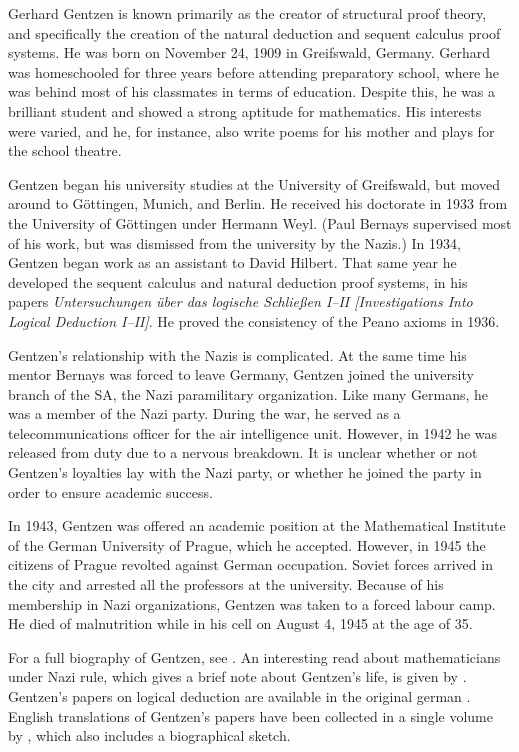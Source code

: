 \documentclass[../../../include/open-logic-section]{subfiles}
\begin{document}



Gerhard Gentzen is known primarily as the creator of structural proof
theory, and specifically the creation of the natural deduction and
sequent calculus proof systems. He was born on November 24, 1909 in
Greifswald, Germany. Gerhard was homeschooled for three years before
attending preparatory school, where he was behind most of his
classmates in terms of education. Despite this, he was a brilliant
student and showed a strong aptitude for mathematics. His interests
were varied, and he, for instance, also write poems for his mother and plays
for the school theatre.

Gentzen began his university studies at the University of Greifswald,
but moved around to G\"{o}ttingen, Munich, and Berlin. He received his
doctorate in 1933 from the University of G\"{o}ttingen under Hermann
Weyl.  (Paul Bernays supervised most of his work, but was dismissed
from the university by the Nazis.)  In 1934, Gentzen began work as an
assistant to David Hilbert. That same year he developed the sequent
calculus and natural deduction proof systems, in his papers
\emph{Untersuchungen \"{u}ber das logische Schlie\ss en I--II
  [Investigations Into Logical Deduction I--II]}. He proved the
consistency of the Peano axioms in 1936.

Gentzen's relationship with the Nazis is complicated.  At the same
time his mentor Bernays was forced to leave Germany, Gentzen joined
the university branch of the SA, the Nazi paramilitary
organization. Like many Germans, he was a member of the Nazi
party. During the war, he served as a telecommunications officer for
the air intelligence unit. However, in 1942 he was released from duty
due to a nervous breakdown. It is unclear whether or not Gentzen's
loyalties lay with the Nazi party, or whether he joined the party in
order to ensure academic success.

In 1943, Gentzen was offered an academic position at the Mathematical
Institute of the German University of Prague, which he
accepted. However, in 1945 the citizens of Prague revolted against
German occupation. Soviet forces arrived in the city and arrested all
the professors at the university.  Because of his membership in Nazi
organizations, Gentzen was taken to a forced labour camp. He died of
malnutrition while in his cell on August 4, 1945 at the age of 35.

\begin{reading}
For a full biography of Gentzen, see \citet{Menzler-Trott2007}.  An
interesting read about mathematicians under Nazi rule, which gives a
brief note about Gentzen's life, is given by \citet{Segal2014}.
Gentzen's papers on logical deduction are available in the original
german \citep{Gentzen1935a,Gentzen1935b}.  English translations of
Gentzen's papers have been collected in a single volume by
\citet{Gentzen1969}, which also includes a biographical sketch.
\end{reading}
\end{document}
